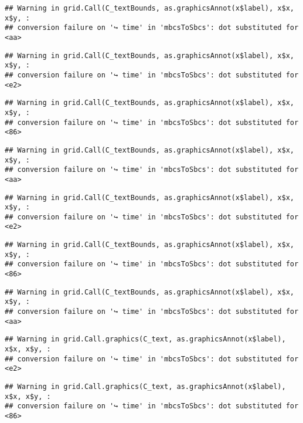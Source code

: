 \documentclass[
]{article}
\begin{document}
\begin{verbatim}
## Warning in grid.Call(C_textBounds, as.graphicsAnnot(x$label), x$x, x$y, :
## conversion failure on '↪ time' in 'mbcsToSbcs': dot substituted for <aa>
\end{verbatim}

\begin{verbatim}
## Warning in grid.Call(C_textBounds, as.graphicsAnnot(x$label), x$x, x$y, :
## conversion failure on '↪ time' in 'mbcsToSbcs': dot substituted for <e2>
\end{verbatim}

\begin{verbatim}
## Warning in grid.Call(C_textBounds, as.graphicsAnnot(x$label), x$x, x$y, :
## conversion failure on '↪ time' in 'mbcsToSbcs': dot substituted for <86>
\end{verbatim}

\begin{verbatim}
## Warning in grid.Call(C_textBounds, as.graphicsAnnot(x$label), x$x, x$y, :
## conversion failure on '↪ time' in 'mbcsToSbcs': dot substituted for <aa>
\end{verbatim}

\begin{verbatim}
## Warning in grid.Call(C_textBounds, as.graphicsAnnot(x$label), x$x, x$y, :
## conversion failure on '↪ time' in 'mbcsToSbcs': dot substituted for <e2>
\end{verbatim}

\begin{verbatim}
## Warning in grid.Call(C_textBounds, as.graphicsAnnot(x$label), x$x, x$y, :
## conversion failure on '↪ time' in 'mbcsToSbcs': dot substituted for <86>
\end{verbatim}

\begin{verbatim}
## Warning in grid.Call(C_textBounds, as.graphicsAnnot(x$label), x$x, x$y, :
## conversion failure on '↪ time' in 'mbcsToSbcs': dot substituted for <aa>
\end{verbatim}

\begin{verbatim}
## Warning in grid.Call.graphics(C_text, as.graphicsAnnot(x$label), x$x, x$y, :
## conversion failure on '↪ time' in 'mbcsToSbcs': dot substituted for <e2>
\end{verbatim}

\begin{verbatim}
## Warning in grid.Call.graphics(C_text, as.graphicsAnnot(x$label), x$x, x$y, :
## conversion failure on '↪ time' in 'mbcsToSbcs': dot substituted for <86>
\end{verbatim}
\end{document}
